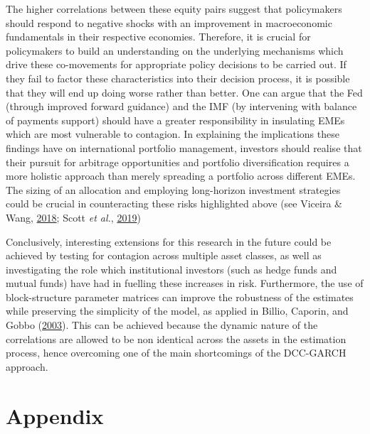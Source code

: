 \documentclass[11pt,preprint, authoryear]{elsarticle}
\numberwithin{equation}{section}
\numberwithin{figure}{section}
\numberwithin{table}{section}
\begin{document}
The higher correlations between these equity pairs suggest that
policymakers should respond to negative shocks with an improvement in
macroeconomic fundamentals in their respective economies. Therefore, it
is crucial for policymakers to build an understanding on the underlying
mechanisms which drive these co-movements for appropriate policy
decisions to be carried out. If they fail to factor these
characteristics into their decision process, it is possible that they
will end up doing worse rather than better. One can argue that the Fed
(through improved forward guidance) and the IMF (by intervening with
balance of payments support) should have a greater responsibility in
insulating EMEs which are most vulnerable to contagion. In explaining
the implications these findings have on international portfolio
management, investors should realise that their pursuit for arbitrage
opportunities and portfolio diversification requires a more holistic
approach than merely spreading a portfolio across different EMEs. The
sizing of an allocation and employing long-horizon investment strategies
could be crucial in counteracting these risks highlighted above (see
Viceira \& Wang, \protect\hyperlink{ref-viceira2018global}{2018}; Scott \emph{et al.},
\protect\hyperlink{ref-scott2019global}{2019})


Conclusively, interesting extensions for this research in the future
could be achieved by testing for contagion across multiple asset
classes, as well as investigating the role which institutional investors
(such as hedge funds and mutual funds) have had in fuelling these
increases in risk. Furthermore, the use of block-structure parameter
matrices can improve the robustness of the estimates while preserving
the simplicity of the model, as applied in Billio, Caporin, and Gobbo
(\protect\hyperlink{ref-billio2003block}{2003}). This can be achieved
because the dynamic nature of the correlations are allowed to be non
identical across the assets in the estimation process, hence overcoming
one of the main shortcomings of the DCC-GARCH approach.

\newpage

\hypertarget{appendix}{%
\section{\texorpdfstring{Appendix
\label{Appendix}}{Appendix }}\label{appendix}}
\end{document}
